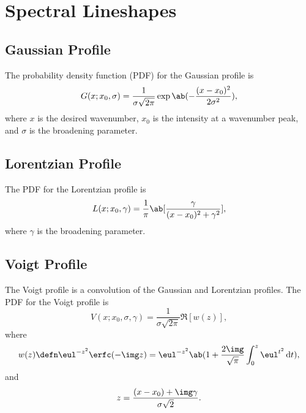 \chapter{Spectral Lineshapes}
\label{c:spectral_lineshapes}

\section{Gaussian Profile}
\label{s:gaussian_profile}

The probability density function (PDF) for the Gaussian profile is
\begin{equation*}
    G(x; x_0, \sigma) = \frac{1}{\sigma\sqrt{2\pi}}\exp\ab(-\frac{(x - x_0)^2}{2\sigma^2}),
\end{equation*}
where $x$ is the desired wavenumber, $x_0$ is the intensity at a wavenumber peak, and $\sigma$ is the broadening parameter.

\section{Lorentzian Profile}
\label{s:lorentzian_profile}

The PDF for the Lorentzian profile is
\begin{equation*}
    L(x; x_0, \gamma) = \frac{1}{\pi}\ab[\frac{\gamma}{(x - x_0)^2 + \gamma^2}],
\end{equation*}
where $\gamma$ is the broadening parameter.

\section{Voigt Profile}
\label{s:voigt_profile}

The Voigt profile is a convolution of the Gaussian and Lorentzian profiles. The PDF for the Voigt profile is
\begin{equation*}
    V(x; x_0, \sigma, \gamma) = \frac{1}{\sigma\sqrt{2\pi}}\Re[w(z)],
\end{equation*}
where
\begin{equation*}
    w(z) \defn \eul^{-z^2}\erfc(-\img z) = \eul^{-z^2}\ab(1 + 
    \frac{2\img}{\sqrt{\pi}}\int_0^z \eul^{t^2} \odif{t}),
\end{equation*}
and
\begin{equation*}
    z = \frac{(x - x_0) + \img\gamma}{\sigma\sqrt{2}}.
\end{equation*}

